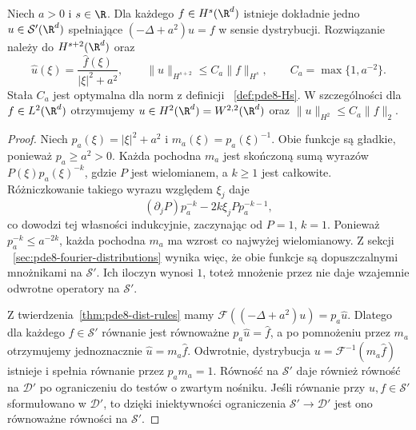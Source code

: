 \begin{twierdzenie}
\label{thm:pde8-helmholtz}
Niech $a>0$ i $s\in\R$. Dla każdego
$f\in H^s(\R^d)$ istnieje dokładnie jedno
$u\in\mathcal S'(\R^d)$ spełniające
$(-\Delta+a^2)u=f$ w sensie dystrybucji.
Rozwiązanie należy do $H^{s+2}(\R^d)$ oraz
\[
 \widehat u(\xi)=\frac{\widehat f(\xi)}{|\xi|^2+a^2},
 \qquad
 \|u\|_{H^{s+2}}\le C_a\|f\|_{H^s},
 \qquad C_a=\max\{1,a^{-2}\}.
\]
Stała $C_a$ jest optymalna dla norm z definicji
~\ref{def:pde8-Hs}.
W szczególności dla $f\in L^2(\R^d)$
otrzymujemy $u\in H^2(\R^d)=W^{2,2}(\R^d)$
oraz $\|u\|_{H^2}\le C_a\|f\|_2$.
\end{twierdzenie}
\begin{proof}
Niech $p_a(\xi)=|\xi|^2+a^2$ i
$m_a(\xi)=p_a(\xi)^{-1}$. Obie funkcje są gładkie,
ponieważ $p_a\ge a^2>0$.
Każda pochodna $m_a$ jest skończoną sumą
wyrazów $P(\xi)p_a(\xi)^{-k}$, gdzie $P$
jest wielomianem, a $k\ge1$ jest całkowite.
Różniczkowanie takiego wyrazu względem $\xi_j$
daje
\[
 (\partial_jP)p_a^{-k}
 -2k\xi_jPp_a^{-k-1},
\]
co dowodzi tej własności indukcyjnie, zaczynając
od $P=1$, $k=1$. Ponieważ $p_a^{-k}\le a^{-2k}$,
każda pochodna $m_a$ ma wzrost co najwyżej
wielomianowy. Z sekcji
~\ref{sec:pde8-fourier-distributions} wynika
więc, że obie funkcje są dopuszczalnymi mnożnikami
na $\mathcal S'$. Ich iloczyn wynosi $1$,
toteż mnożenie przez nie daje wzajemnie odwrotne
operatory na $\mathcal S'$.

Z twierdzenia~\ref{thm:pde8-dist-rules} mamy
$\mathcal F((-\Delta+a^2)u)=p_a\widehat u$.
Dlatego dla każdego $f\in\mathcal S'$ równanie
jest równoważne $p_a\widehat u=\widehat f$,
a po pomnożeniu przez $m_a$ otrzymujemy
jednoznacznie $\widehat u=m_a\widehat f$.
Odwrotnie, dystrybucja
$u=\mathcal F^{-1}(m_a\widehat f)$ istnieje
i spełnia równanie przez $p_am_a=1$.
Równość na $\mathcal S'$ daje również równość
na $\mathcal D'$ po ograniczeniu do testów
o zwartym nośniku. Jeśli równanie przy
$u,f\in\mathcal S'$ sformułowano w $\mathcal D'$,
to dzięki iniektywności ograniczenia
$\mathcal S'\to\mathcal D'$ jest ono równoważne
równości na $\mathcal S'$.


\end{proof}
